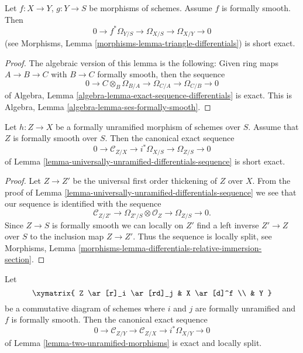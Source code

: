 \begin{lemma}
\label{lemma-triangle-differentials-formally-smooth}
Let $f : X \to Y$, $g : Y \to S$ be morphisms of schemes.
Assume $f$ is formally smooth. Then
$$
0 \to f^*\Omega_{Y/S} \to \Omega_{X/S} \to \Omega_{X/Y} \to 0
$$
(see
Morphisms, Lemma \ref{morphisms-lemma-triangle-differentials})
is short exact.
\end{lemma}

\begin{proof}
The algebraic version of this lemma is the following:
Given ring maps $A \to B \to C$ with $B \to C$ formally smooth, then
the sequence
$$
0 \to C \otimes_B \Omega_{B/A} \to \Omega_{C/A} \to \Omega_{C/B} \to 0
$$
of
Algebra, Lemma \ref{algebra-lemma-exact-sequence-differentials}
is exact. This is
Algebra, Lemma \ref{algebra-lemma-ses-formally-smooth}.
\end{proof}

\begin{lemma}
\label{lemma-differentials-formally-unramified-formally-smooth}
Let $h : Z \to X$ be a formally unramified morphism of schemes over $S$.
Assume that $Z$ is formally smooth over $S$. Then the
canonical exact sequence
$$
0 \to \mathcal{C}_{Z/X} \to i^*\Omega_{X/S} \to \Omega_{Z/S} \to 0
$$
of
Lemma \ref{lemma-universally-unramified-differentials-sequence}
is short exact.
\end{lemma}

\begin{proof}
Let $Z \to Z'$ be the universal first order thickening of $Z$ over $X$.
From the proof of
Lemma \ref{lemma-universally-unramified-differentials-sequence}
we see that our sequence is identified with the sequence
$$
\mathcal{C}_{Z/Z'} \to \Omega_{Z'/S} \otimes \mathcal{O}_Z \to
\Omega_{Z/S} \to 0.
$$
Since $Z \to S$ is formally smooth we can locally on $Z'$ find
a left inverse $Z' \to Z$ over $S$ to the inclusion map $Z \to Z'$.
Thus the sequence is locally split, see
Morphisms, Lemma \ref{morphisms-lemma-differentials-relative-immersion-section}.
\end{proof}

\begin{lemma}
\label{lemma-two-unramified-morphisms-formally-smooth}
Let
$$
\xymatrix{
Z \ar[r]_i \ar[rd]_j & X \ar[d]^f \\
& Y
}
$$
be a commutative diagram of schemes where $i$ and $j$ are formally
unramified and $f$ is formally smooth. Then the canonical exact sequence
$$
0 \to
\mathcal{C}_{Z/Y} \to
\mathcal{C}_{Z/X} \to
i^*\Omega_{X/Y} \to 0
$$
of
Lemma \ref{lemma-two-unramified-morphisms}
is exact and locally split.
\end{lemma}

